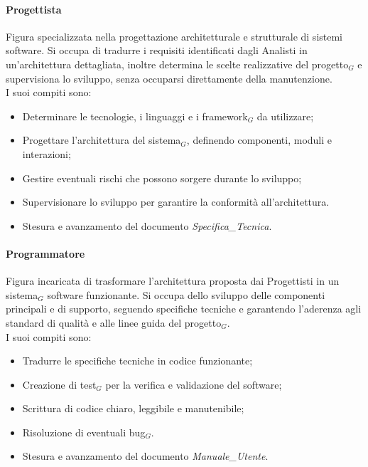 \documentclass[10pt]{article}
\begin{document}
\begin{justify}
        \paragraph{Progettista}
        Figura specializzata nella progettazione architetturale e strutturale di sistemi software. Si occupa di tradurre i requisiti identificati dagli Analisti in un'architettura dettagliata, inoltre determina le scelte realizzative del progetto$_G$ e supervisiona lo sviluppo, senza occuparsi direttamente della manutenzione.\\
        I suoi compiti sono:
        \begin{itemize}
            \item Determinare le tecnologie, i linguaggi e i framework$_G$ da utilizzare;
            \item Progettare l'architettura del sistema$_G$, definendo componenti, moduli e interazioni;
            \item Gestire eventuali rischi che possono sorgere durante lo sviluppo;
            \item Supervisionare lo sviluppo per garantire la conformità all'architettura.
            \item Stesura e avanzamento del documento \textit{Specifica\_Tecnica}.
        \end{itemize}

        \paragraph{Programmatore}
        Figura incaricata di trasformare l'architettura proposta dai Progettisti in un sistema$_G$ software funzionante. Si occupa dello sviluppo delle componenti principali e di supporto, seguendo specifiche tecniche e garantendo l'aderenza agli standard di qualità e alle linee guida del progetto$_G$.\\
        I suoi compiti sono:
        \begin{itemize}
            \item Tradurre le specifiche tecniche in codice funzionante;
            \item Creazione di test$_G$ per la verifica e validazione del software;
            \item Scrittura di codice chiaro, leggibile e manutenibile;
            \item Risoluzione di eventuali bug$_G$.
            \item Stesura e avanzamento del documento \textit{Manuale\_Utente}.
        \end{itemize}


\end{justify}
\end{document}
